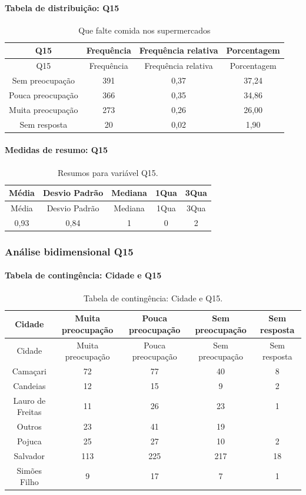 \documentclass[]{article}
\let\oldparagraph\paragraph
\renewcommand{\paragraph}[1]{\oldparagraph{#1}\mbox{}}
\begin{document}
\hypertarget{tabela-de-distribuiuxe7uxe3o-q15}{%
\paragraph{Tabela de distribuição: Q15}\label{tabela-de-distribuiuxe7uxe3o-q15}}

\begin{longtable}[]{@{}cccc@{}}
\caption{\label{tab:unnamed-chunk-69}Que falte comida nos supermercados}\tabularnewline
\toprule
Q15 & Frequência & Frequência relativa & Porcentagem\tabularnewline
\midrule
\endfirsthead
\toprule
Q15 & Frequência & Frequência relativa & Porcentagem\tabularnewline
\midrule
\endhead
Sem preocupação & 391 & 0,37 & 37,24\tabularnewline
Pouca preocupação & 366 & 0,35 & 34,86\tabularnewline
Muita preocupação & 273 & 0,26 & 26,00\tabularnewline
Sem resposta & 20 & 0,02 & 1,90\tabularnewline
\bottomrule
\end{longtable}

\hypertarget{medidas-de-resumo-q15}{%
\paragraph{Medidas de resumo: Q15}\label{medidas-de-resumo-q15}}

\begin{longtable}[]{@{}ccccc@{}}
\caption{\label{tab:unnamed-chunk-70}Resumos para variável Q15.}\tabularnewline
\toprule
Média & Desvio Padrão & Mediana & 1Qua & 3Qua\tabularnewline
\midrule
\endfirsthead
\toprule
Média & Desvio Padrão & Mediana & 1Qua & 3Qua\tabularnewline
\midrule
\endhead
0,93 & 0,84 & 1 & 0 & 2\tabularnewline
\bottomrule
\end{longtable}

\cleardoublepage

\hypertarget{anuxe1lise-bidimensional-q15}{%
\subsubsection{Análise bidimensional Q15}\label{anuxe1lise-bidimensional-q15}}

\hypertarget{tabela-de-continguxeancia-cidade-e-q15}{%
\paragraph{Tabela de contingência: Cidade e Q15}\label{tabela-de-continguxeancia-cidade-e-q15}}

\begin{longtable}[]{@{}ccccc@{}}
\caption{\label{tab:unnamed-chunk-71}Tabela de contingência: Cidade e Q15.}\tabularnewline
\toprule
Cidade & Muita preocupação & Pouca preocupação & Sem preocupação & Sem resposta\tabularnewline
\midrule
\endfirsthead
\toprule
Cidade & Muita preocupação & Pouca preocupação & Sem preocupação & Sem resposta\tabularnewline
\midrule
\endhead
Camaçari & 72 & 77 & 40 & 8\tabularnewline
Candeias & 12 & 15 & 9 & 2\tabularnewline
Lauro de Freitas & 11 & 26 & 23 & 1\tabularnewline
Outros & 23 & 41 & 19 &\tabularnewline
Pojuca & 25 & 27 & 10 & 2\tabularnewline
Salvador & 113 & 225 & 217 & 18\tabularnewline
Simões Filho & 9 & 17 & 7 & 1\tabularnewline
\bottomrule
\end{longtable}
\end{document}
